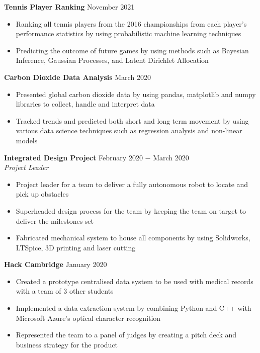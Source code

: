 \documentclass{article}
\begin{document}
\textbf{Tennis Player Ranking} \hfill November 2021
\begin{itemize}
    \item Ranking all tennis players from the 2016 championships from each player's performance statistics by using probabilistic machine learning techniques
    \item Predicting the outcome of future games by using methods such as Bayesian Inference, Gaussian Processes, and Latent Dirichlet Allocation
\end{itemize} \smallskip

\textbf{Carbon Dioxide Data Analysis} \hfill  March 2020
\begin{itemize}
    \item Presented global carbon dioxide data by using pandas, matplotlib and numpy libraries to collect, handle and interpret data
    \item Tracked trends and predicted both short and long term movement by using various data science techniques such as regression analysis and non-linear models
\end{itemize} \smallskip

\textbf{Integrated Design Project} \hfill February 2020 $-$ March 2020\\
\textit{Project Leader}
\begin{itemize}
    \item Project leader for a team to deliver a fully autonomous robot to locate and pick up obstacles
    \item Superheaded design process for the team by keeping the team on target to deliver the milestones set
    \item Fabricated mechanical system to house all components by using Solidworks, LTSpice, 3D printing and laser cutting
\end{itemize} \smallskip

\textbf{Hack Cambridge} \hfill January 2020
\begin{itemize}
    \item Created a prototype centralised data system to be used with medical records with a team of 3 other students
    \item Implemented a data extraction system by combining Python and C++ with Microsoft Azure’s optical character recognition 
    \item Represented the team to a panel of judges by creating a pitch deck and business strategy for the product
\end{itemize} \smallskip
\end{document}
